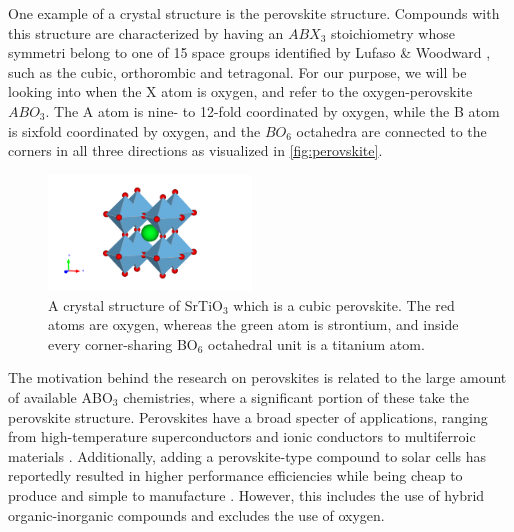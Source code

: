 One example of a crystal structure is the perovskite structure. Compounds with this structure are characterized by having an $ABX_3$ stoichiometry whose symmetri belong to one of 15 space groups identified by Lufaso \& Woodward \cite{Lufaso2001}, such as the cubic, orthorombic and tetragonal. For our purpose, we will be looking into when the X atom is oxygen, and refer to the oxygen-perovskite $ABO_3$. The A atom is nine- to 12-fold coordinated by oxygen, while the B atom is sixfold coordinated by oxygen, and the $BO_6$ octahedra are connected to the corners in all three directions as visualized in \autoref{fig:perovskite}.

\begin{figure}
  \centering
  \includegraphics[width=0.48\textwidth]{theory/figures/SrTiO3_mp-5229_primitive.pdf}
  \caption{A crystal structure of SrTiO$_3$ which is a cubic perovskite. The red atoms are oxygen, whereas the green atom is strontium, and inside every corner-sharing BO$_6$ octahedral unit is a titanium atom.}
  \label{fig:perovskite}
\end{figure}

The motivation behind the research on perovskites is related to the large amount of available ABO$_3$ chemistries, where a significant portion of these take the perovskite structure. Perovskites have a broad specter of applications, ranging from high-temperature superconductors \cite{Bednorz1988} and ionic conductors \cite{Boivin1998} to multiferroic materials \cite{Cheong2007}. Additionally, adding a perovskite-type compound to solar cells has reportedly resulted in higher performance efficiencies while being cheap to produce and simple to manufacture \cite{IbnMohammed2017, Chen2014}. However, this includes the use of hybrid organic-inorganic compounds and excludes the use of oxygen.


